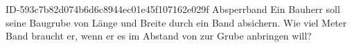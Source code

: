 \begin{exercise}
      {ID-593c7b82d074b6d6c8944ec01e45f107162e029f}
      {Absperrband}
  \ifproblem\problem
    Ein Bauherr soll seine Baugrube von  Länge und  Breite
    durch ein Band absichern. Wie viel Meter Band braucht er, wenn er es im
    Abstand von  zur Grube anbringen will?
  \fi
\end{exercise}
